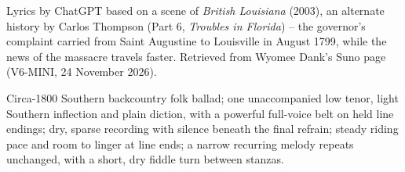 
\begin{notes}
Lyrics by ChatGPT based on a scene of \emph{British Louisiana} (2003), an alternate history by Carlos Thompson (Part 6, \emph{Troubles in Florida}) -- the governor's complaint carried from Saint Augustine to Louisville in August 1799, while the news of the massacre travels faster. Retrieved from Wyomee Dank's Suno page (V6-MINI, 24 November 2026).
\end{notes}
\begin{style}
Circa-1800 Southern backcountry folk ballad; one unaccompanied low tenor, light Southern inflection and plain diction, with a powerful full-voice belt on held line endings; dry, sparse recording with silence beneath the final refrain; steady riding pace and room to linger at line ends; a narrow recurring melody repeats unchanged, with a short, dry fiddle turn between stanzas.
\end{style}
